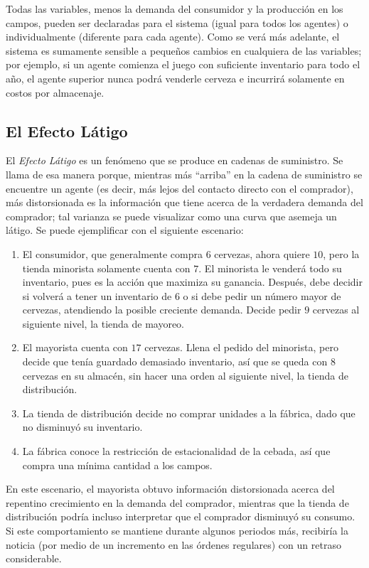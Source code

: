 Todas las variables, menos la demanda del consumidor y la producci\'on en los campos, pueden ser declaradas para el sistema (igual para todos los agentes) o individualmente (diferente para cada agente). Como se ver\'a m\'as adelante, el sistema es sumamente sensible a peque\~nos cambios en cualquiera de las variables; por ejemplo, si un agente comienza el juego con suficiente inventario para todo el a\~no, el agente superior nunca podr\'a venderle cerveza e incurrir\'a solamente en costos por almacenaje.

\subsection{El Efecto Látigo}

El \textit{Efecto Látigo} es un fen\'omeno que se produce en cadenas de suministro. Se llama de esa manera porque, mientras m\'as ``arriba'' en la cadena de suministro se encuentre un agente (es decir, m\'as lejos del contacto directo con el comprador), m\'as distorsionada es la informaci\'on que tiene acerca de la verdadera demanda del comprador; tal varianza se puede visualizar como una curva que asemeja un l\'atigo. Se puede ejemplificar con el siguiente escenario:

\begin{enumerate}
    \item El consumidor, que generalmente compra $6$ cervezas, ahora quiere $10$, pero la tienda minorista solamente cuenta con $7$. El minorista le venderá todo su inventario, pues es la acci\'on que maximiza su ganancia. Despu\'es, debe decidir si volverá a tener un inventario de $6$ o si debe pedir un número mayor de cervezas, atendiendo la posible creciente demanda. Decide pedir $9$ cervezas al siguiente nivel, la tienda de mayoreo.
    \item El mayorista cuenta con $17$ cervezas. Llena el pedido del minorista, pero decide que ten\'ia guardado demasiado inventario, as\'i que se queda con $8$ cervezas en su almac\'en, sin hacer una orden al siguiente nivel, la tienda de distribución.
    \item La tienda de distribuci\'on decide no comprar unidades a la f\'abrica, dado que no disminuy\'o su inventario.
    \item La f\'abrica conoce la restricci\'on de estacionalidad de la cebada, as\'i que compra una m\'inima cantidad a los campos.
\end{enumerate}

En este escenario, el mayorista obtuvo informaci\'on distorsionada acerca del repentino crecimiento en la demanda del comprador, mientras que la tienda de distribución podr\'ia incluso interpretar que el comprador disminuy\'o su consumo. Si este comportamiento se mantiene durante algunos periodos m\'as, recibir\'ia la noticia (por medio de un incremento en las \'ordenes regulares) con un retraso considerable.\\

